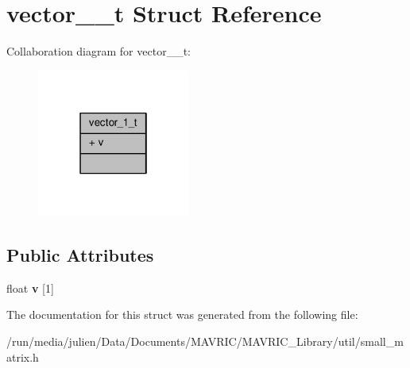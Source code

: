 \hypertarget{structvector__1__t}{\section{vector\+\_\+\_\+t Struct Reference}
\label{structvector__1__t}
}


Collaboration diagram for vector\+\_\+\_\+t\+:
\nopagebreak
\begin{figure}[H]
\begin{center}
\leavevmode
\includegraphics[width=142pt]{structvector__1__t__coll__graph}
\end{center}
\end{figure}
\subsection*{Public Attributes}
\begin{DoxyCompactItemize}
\item 
\hypertarget{structvector__1__t_a3ce58045af27337e883fe2a68481f714}{float {\bfseries v} \mbox{[}1\mbox{]}}\label{structvector__1__t_a3ce58045af27337e883fe2a68481f714}

\end{DoxyCompactItemize}


The documentation for this struct was generated from the following file\+:\begin{DoxyCompactItemize}
\item 
/run/media/julien/\+Data/\+Documents/\+M\+A\+V\+R\+I\+C/\+M\+A\+V\+R\+I\+C\+\_\+\+Library/util/small\+\_\+matrix.\+h\end{DoxyCompactItemize}
